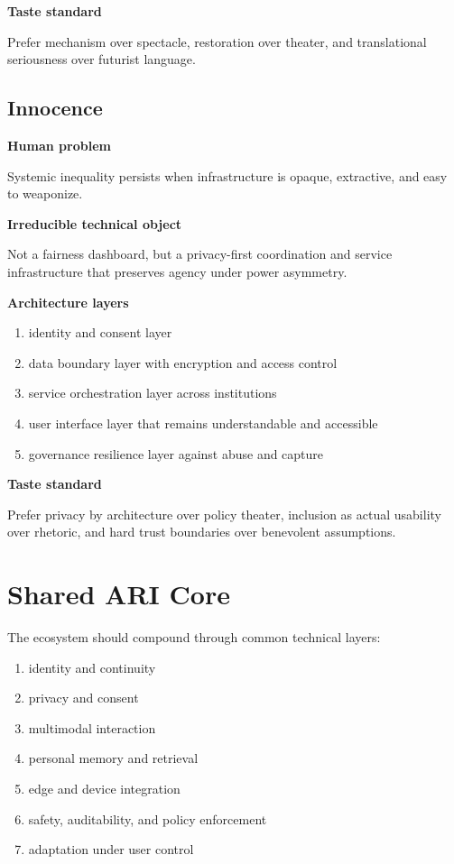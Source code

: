 \documentclass[11pt]{article}
\begin{document}
\textbf{Taste standard}

Prefer mechanism over spectacle, restoration over theater, and translational seriousness over futurist language.

\subsection{Innocence}

\textbf{Human problem}

Systemic inequality persists when infrastructure is opaque, extractive, and easy to weaponize.

\textbf{Irreducible technical object}

Not a fairness dashboard, but a privacy-first coordination and service infrastructure that preserves agency under power asymmetry.

\textbf{Architecture layers}

\begin{enumerate}
  \item identity and consent layer
  \item data boundary layer with encryption and access control
  \item service orchestration layer across institutions
  \item user interface layer that remains understandable and accessible
  \item governance resilience layer against abuse and capture
\end{enumerate}

\textbf{Taste standard}

Prefer privacy by architecture over policy theater, inclusion as actual usability over rhetoric, and hard trust boundaries over benevolent assumptions.

\section{Shared ARI Core}

The ecosystem should compound through common technical layers:

\begin{enumerate}
  \item identity and continuity
  \item privacy and consent
  \item multimodal interaction
  \item personal memory and retrieval
  \item edge and device integration
  \item safety, auditability, and policy enforcement
  \item adaptation under user control
\end{enumerate}
\end{document}
